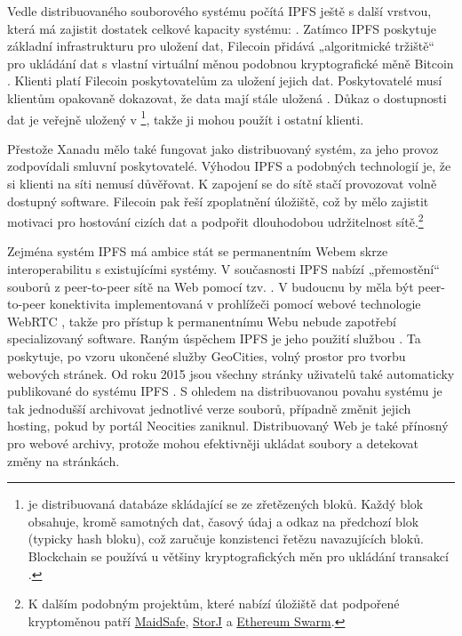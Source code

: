 Vedle distribuovaného souborového systému počítá IPFS ještě s další vrstvou, která má zajistit dostatek celkové kapacity systému: . Zatímco IPFS poskytuje základní infrastrukturu pro uložení dat, Filecoin přidává „algoritmické tržiště“ pro ukládání dat s vlastní virtuální měnou podobnou kryptografické měně Bitcoin \autocite{Filecoin2017}. Klienti platí Filecoin poskytovatelům za uložení jejich dat. Poskytovatelé musí klientům opakovaně dokazovat, že data mají stále uložená \autocite[10]{Filecoin2017}. Důkaz o dostupnosti dat je veřejně uložený v \footnote{ je distribuovaná databáze skládající se ze zřetězených bloků. Každý blok obsahuje, kromě samotných dat, časový údaj a odkaz na předchozí blok (typicky hash bloku), což zaručuje konzistenci řetězu navazujících bloků. Blockchain se používá u většiny kryptografických měn pro ukládání transakcí \autocite{wiki:Blockchain}.}, takže ji mohou použít i ostatní klienti.

Přestože Xanadu mělo také fungovat jako distribuovaný systém, za jeho provoz zodpovídali smluvní poskytovatelé. Výhodou IPFS a podobných technologií je, že si klienti na síti nemusí důvěřovat. K zapojení se do sítě stačí provozovat volně dostupný software. Filecoin pak řeší zpoplatnění úložiště, což by mělo zajistit motivaci pro hostování cizích dat a podpořit dlouhodobou udržitelnost sítě.\footnote{K dalším podobným projektům, které nabízí úložiště dat podpořené kryptoměnou patří \href{https://maidsafe.net/}{MaidSafe}, \href{https://storj.io/}{StorJ} a \href{https://swarm-guide.readthedocs.io/}{Ethereum Swarm}.}

Zejména systém IPFS má ambice stát se permanentním Webem skrze interoperabilitu s existujícími systémy.
V současnosti IPFS nabízí „přemostění“ souborů z peer-to-peer sítě na Web pomocí tzv. .
V budoucnu by měla být peer-to-peer konektivita implementovaná v prohlížeči pomocí webové technologie WebRTC \autocite[3.2]{IPFS}, takže pro přístup k permanentnímu Webu nebude zapotřebí specializovaný software. Raným úspěchem IPFS je jeho použití službou . Ta poskytuje, po vzoru ukončené služby GeoCities, volný prostor pro tvorbu webových stránek. Od roku 2015 jsou všechny stránky uživatelů také automaticky publikované do systému IPFS \autocite{NeocitiesIPFS}. S ohledem na distribuovanou povahu systému je tak jednodušší archivovat jednotlivé verze souborů, případně změnit jejich hosting, pokud by portál Neocities zaniknul. Distribuovaný Web je také přínosný pro webové archivy, protože mohou efektivněji ukládat soubory a detekovat změny na stránkách.

